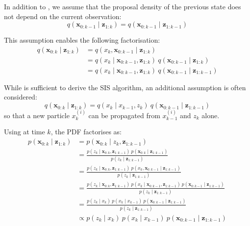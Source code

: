 \begin{assumption}\label{th:SIS_hypotheses}
	In addition to , we assume that the proposal density of the previous state does not depend on the current observation:
	\begin{equation}
		q(\mathbf{x}_{0:k-1}\mid\mathbf{z}_{1:k})=q(\mathbf{x}_{0:k-1}\mid\mathbf{z}_{1:k-1})
	\end{equation}
\end{assumption}

This assumption enables the following factorisation:
\begin{equation}
	\begin{aligned}
	q(\mathbf{x}_{0:k}\mid\mathbf{z}_{1:k})&=q(x_k,\mathbf{x}_{0:k-1}\mid\mathbf{z}_{1:k})\\
	&=q(x_k\mid\mathbf{x}_{0:k-1},\mathbf{z}_{1:k})\:q(\mathbf{x}_{0:k-1}\mid\mathbf{z}_{1:k})\\
	&=q(x_k\mid\mathbf{x}_{0:k-1},\mathbf{z}_{1:k})\:q(\mathbf{x}_{0:k-1}\mid\mathbf{z}_{1:k-1})
	\end{aligned}
\end{equation}

While  is sufficient to derive the SIS algorithm, an additional assumption is often considered:
\begin{equation}
	q(\mathbf{x}_{0:k}\mid\mathbf{z}_{1:k})=q(x_k\mid x_{k-1},z_k)\:q(\mathbf{x}_{0:k-1}\mid\mathbf{z}_{1:k-1})\label{eq:simplification_q}
\end{equation}
so that a new particle $x_k^{(i)}$ can be propagated from $x_{k-1}^{(i)}$ and $z_k$ alone.

Using  at time $k$, the PDF factorises as:
\begin{equation}
	\begin{aligned}
		p(\mathbf{x}_{0:k}\mid\mathbf{z}_{1:k})&=p(\mathbf{x}_{0:k}\mid z_k,\mathbf{z}_{1:k-1})\\
		&=\frac{p(z_k\mid\mathbf{x}_{0:k},\mathbf{z}_{1:k-1})\:p(\mathbf{x}_{0:k}\mid\mathbf{z}_{1:k-1})}{p(z_k\mid\mathbf{z}_{1:k-1})}\\
		&=\frac{p(z_k\mid\mathbf{x}_{0:k},\mathbf{z}_{1:k-1})\:p(x_k,\mathbf{x}_{0:k-1}\mid\mathbf{z}_{1:k-1})}{p(z_k\mid\mathbf{z}_{1:k-1})}\\
		&=\frac{p(z_k\mid\mathbf{x}_{0:k},\mathbf{z}_{1:k-1})\:p(x_k\mid\mathbf{x}_{0:k-1},\mathbf{z}_{1:k-1})\:p(\mathbf{x}_{0:k-1}\mid\mathbf{z}_{1:k-1})}{p(z_k\mid\mathbf{z}_{1:k-1})}\\
		&=\frac{p(z_k\mid x_k)\:p(x_k\mid x_{k-1})\:p(\mathbf{x}_{0:k-1}\mid\mathbf{z}_{1:k-1})}{p(z_k\mid\mathbf{z}_{1:k-1})}\\
		&\propto p(z_k\mid x_k)\:p(x_k\mid x_{k-1})\:p(\mathbf{x}_{0:k-1}\mid\mathbf{z}_{1:k-1})
	\end{aligned}\label{eq:recursive_p}
\end{equation}

